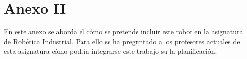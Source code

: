 \chapter*{Anexo II}
\label{cap:anexoii}

\noindent En este anexo se aborda el cómo se pretende incluir este robot en la asignatura de Robótica Industrial. Para ello 
se ha preguntado a los profesores actuales de esta asignatura cómo podría integrarse este trabajo su la planificación.
